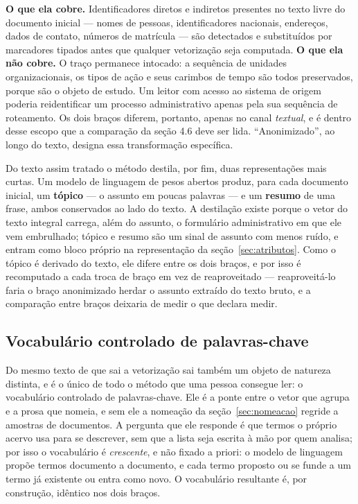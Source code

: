 \textbf{O que ela cobre.} Identificadores diretos e indiretos presentes no texto livre do documento
inicial --- nomes de pessoas, identificadores nacionais, endereços, dados de contato, números de
matrícula --- são detectados e substituídos por marcadores tipados antes que qualquer vetorização
seja computada. \textbf{O que ela não cobre.} O traço permanece intocado: a sequência de unidades
organizacionais, os tipos de ação e seus carimbos de tempo são todos preservados, porque são o
objeto de estudo. Um leitor com acesso ao sistema de origem poderia reidentificar um processo
administrativo apenas pela sua sequência de roteamento. Os dois braços diferem, portanto, apenas no
canal \emph{textual}, e é dentro desse escopo que a comparação da seção 4.6 deve ser lida.
``Anonimizado'', ao longo do texto, designa essa transformação específica.

Do texto assim tratado o método destila, por fim, duas representações mais curtas. Um modelo de
linguagem de pesos abertos produz, para cada documento inicial, um \textbf{tópico} --- o assunto em
poucas palavras --- e um \textbf{resumo} de uma frase, ambos conservados ao lado do texto. A
destilação existe porque o vetor do texto integral carrega, além do assunto, o formulário
administrativo em que ele vem embrulhado; tópico e resumo são um sinal de assunto com menos ruído,
e entram como bloco próprio na representação da seção~\ref{sec:atributos}. Como o tópico é derivado
do texto, ele difere entre os dois braços, e por isso é recomputado a cada troca de braço em vez de
reaproveitado --- reaproveitá-lo faria o braço anonimizado herdar o assunto extraído do texto
bruto, e a comparação entre braços deixaria de medir o que declara medir.

\subsection{Vocabulário controlado de palavras-chave}\label{sec:keywords}

Do mesmo texto de que sai a vetorização sai também um objeto de natureza distinta, e é o único de
todo o método que uma pessoa consegue ler: o vocabulário controlado de palavras-chave. Ele é a
ponte entre o vetor que agrupa e a prosa que nomeia, e sem ele a nomeação da
seção~\ref{sec:nomeacao} regride a amostras de documentos. A pergunta que ele responde é que termos
o próprio acervo usa para se descrever, sem que a lista seja escrita à mão por quem analisa; por
isso o vocabulário é \emph{crescente}, e não fixado a priori: o modelo de linguagem propõe termos
documento a documento, e cada termo proposto ou se funde a um termo já existente ou entra como
novo. O vocabulário resultante é, por construção, idêntico nos dois braços.

